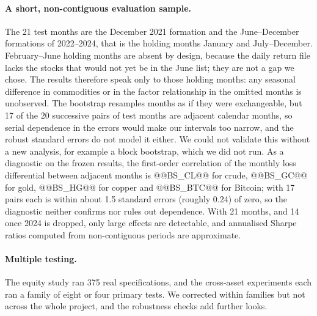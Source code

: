 \documentclass[11pt]{article}
\begin{document}
\paragraph{A short, non-contiguous evaluation sample.} The 21 test months are the December 2021 formation and the June--December formations of 2022--2024, that is the holding months January and July--December. February--June holding months are absent by design, because the daily return file lacks the stocks that would not yet be in the June list; they are not a gap we chose. The results therefore speak only to those holding months: any seasonal difference in commodities or in the factor relationship in the omitted months is unobserved. The bootstrap resamples months as if they were exchangeable, but 17 of the 20 successive pairs of test months are adjacent calendar months, so serial dependence in the errors would make our intervals too narrow, and the robust standard errors do not model it either. We could not validate this without a new analysis, for example a block bootstrap, which we did not run. As a diagnostic on the frozen results, the first-order correlation of the monthly loss differential between adjacent months is @@BS_CL@@ for crude, @@BS_GC@@ for gold, @@BS_HG@@ for copper and @@BS_BTC@@ for Bitcoin; with 17 pairs each is within about 1.5 standard errors (roughly 0.24) of zero, so the diagnostic neither confirms nor rules out dependence. With 21 months, and 14 once 2024 is dropped, only large effects are detectable, and annualised Sharpe ratios computed from non-contiguous periods are approximate.

\paragraph{Multiple testing.} The equity study ran 375 real specifications, and the cross-asset experiments each ran a family of eight or four primary tests. We corrected within families but not across the whole project, and the robustness checks add further looks.
\end{document}
